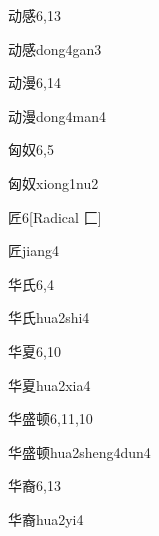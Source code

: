 \begin{entry}{动感}{6,13}
  \begin{phonetics}{动感}{dong4gan3}
  \end{phonetics}
\end{entry}

\begin{entry}{动漫}{6,14}
  \begin{phonetics}{动漫}{dong4man4}
  \end{phonetics}
\end{entry}

\begin{entry}{匈奴}{6,5}
  \begin{phonetics}{匈奴}{xiong1nu2}
  \end{phonetics}
\end{entry}

\begin{entry}{匠}{6}[Radical 匚]
  \begin{phonetics}{匠}{jiang4}
  \end{phonetics}
\end{entry}

\begin{entry}{华氏}{6,4}
  \begin{phonetics}{华氏}{hua2shi4}
  \end{phonetics}
\end{entry}

\begin{entry}{华夏}{6,10}
  \begin{phonetics}{华夏}{hua2xia4}
  \end{phonetics}
\end{entry}

\begin{entry}{华盛顿}{6,11,10}
  \begin{phonetics}{华盛顿}{hua2sheng4dun4}
  \end{phonetics}
\end{entry}

\begin{entry}{华裔}{6,13}
  \begin{phonetics}{华裔}{hua2yi4}
  \end{phonetics}
\end{entry}

